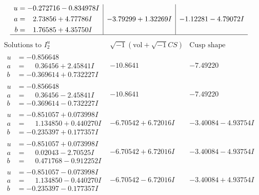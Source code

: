 \documentclass[1p]{elsarticle_modified}
\theoremstyle{definition}
\newcommand{\I}{\sqrt{-1}}
\begin{document}
$$\begin{array}{c|c|c}
\begin{aligned}
u &= -0.272716 - 0.834978 I \\
a &= \phantom{-}2.73856 + 4.77786 I \\
b &= \phantom{-}1.76585 + 4.35750 I\end{aligned}
 & -3.79299 + 1.32269 I & -1.12281 - 4.79072 I\\
 \hline 
 \end{array}$$\newpage$$\begin{array}{c|c|c}  
\text{Solutions to }I^u_{2}& \I (\text{vol} + \sqrt{-1}CS) & \text{Cusp shape}\\
 \hline 
\begin{aligned}
u &= -0.856648\phantom{ +0.000000I} \\
a &= \phantom{-}0.36456 + 2.45841 I \\
b &= -0.369614 + 0.732227 I\end{aligned}
 & -10.8641\phantom{ +0.000000I} & -7.49220\phantom{ +0.000000I} \\ \hline\begin{aligned}
u &= -0.856648\phantom{ +0.000000I} \\
a &= \phantom{-}0.36456 - 2.45841 I \\
b &= -0.369614 - 0.732227 I\end{aligned}
 & -10.8641\phantom{ +0.000000I} & -7.49220\phantom{ +0.000000I} \\ \hline\begin{aligned}
u &= -0.851057 + 0.073998 I \\
a &= \phantom{-}1.134850 + 0.440270 I \\
b &= -0.235397 + 0.177357 I\end{aligned}
 & -6.70542 + 6.72016 I & -3.40084 - 4.93754 I \\ \hline\begin{aligned}
u &= -0.851057 + 0.073998 I \\
a &= \phantom{-}0.02043 - 2.70525 I \\
b &= \phantom{-}0.471768 - 0.912252 I\end{aligned}
 & -6.70542 + 6.72016 I & -3.40084 - 4.93754 I \\ \hline\begin{aligned}
u &= -0.851057 - 0.073998 I \\
a &= \phantom{-}1.134850 - 0.440270 I \\
b &= -0.235397 - 0.177357 I\end{aligned}
 & -6.70542 - 6.72016 I & -3.40084 + 4.93754 I \\ \hline\begin{aligned}

\end{aligned}
\end{array}$$
\end{document}
